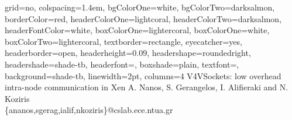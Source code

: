\documentclass[a0paper,portrait,final]{baposter}
\begin{document}
\newlength{\leftimgwidth}
\begin{poster}%
  {
  grid=no,
  colspacing=1.4em,
  bgColorOne=white,
  bgColorTwo=darksalmon,
  borderColor=red,
  headerColorOne=lightcoral,
  headerColorTwo=darksalmon,
  headerFontColor=white,
  boxColorOne=lightercoral,
  boxColorOne=white,
  boxColorTwo=lightercoral,
  textborder=rectangle,
  eyecatcher=yes,
  headerborder=open,
  headerheight=0.09\textheight,
  headershape=roundedright,
  headershade=shade-tb,
  headerfont=\Large\textsf, %
  boxshade=plain,
  textfont={\sf },
  background=shade-tb,
  linewidth=2pt,
  columns=4
  }
  {
   }
  {V4VSockets: low overhead intra-node communication in Xen}
  {A. Nanos, S. Gerangelos, I. Alifieraki and N. Koziris\\ \{ananos,sgerag,ialif,nkoziris\}@cslab.ece.ntua.gr}
  {   
   }


\end{poster}
\end{document}

